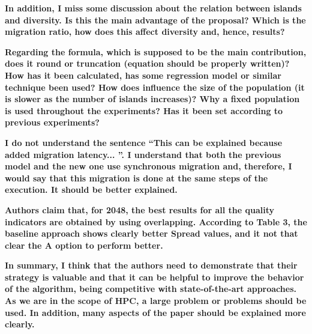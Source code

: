 \documentclass{article}
\begin{document}
\textbf{ In addition, I miss some discussion about the relation between islands and diversity. Is this the main advantage of the proposal? Which is the migration ratio, how does this affect diversity and, hence, results?}

\textbf{ Regarding the formula, which is supposed to be the main contribution, does it round or truncation (equation should be properly written)? How has it been calculated, has some regression model or similar technique been used? How does influence the size of the population (it is slower as the number of islands increases)? Why a fixed population is used throughout the experiments? Has it been set according to previous experiments?}

\textbf{ I do not understand the sentence ``This can be explained because added migration latency... ''. I understand that both the previous model and the new one use synchronous migration and, therefore, I would say that this migration is done at the same steps of the execution. It should be better explained.}

\textbf{ Authors claim that, for 2048, the best results for all the quality indicators are obtained by using overlapping. According to Table 3, the baseline approach shows clearly better Spread values, and it not that clear the A option to perform better.}

\textbf{In summary, I think that the authors need to demonstrate that their strategy is valuable and that it can be helpful to improve the behavior of the algorithm, being competitive with state-of-the-art approaches.  As we are in the scope of HPC,  a large problem or problems should be used. In addition, many aspects of the paper should be explained more clearly.}
\end{document}
